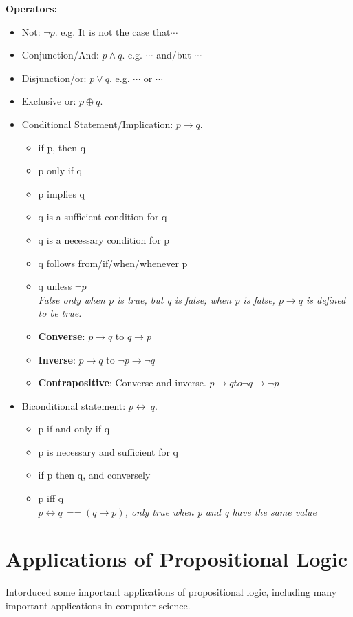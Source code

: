 \documentclass[none,green,normal,cn]{elegantnote}
\begin{document}
\textbf{Operators:}
\begin{itemize}
\item Not: $\neg p$. \qquad e.g. It is not the case that$\cdots$
\item Conjunction/And: $p \wedge q$. \qquad e.g. $\cdots$ and/but $\cdots$
\item Disjunction/or: $p \vee q$. \qquad e.g. $\cdots$ or $\cdots$
\item Exclusive or: $p \oplus q$.
\item Conditional Statement/Implication: $p \rightarrow q$.
      \begin{itemize}
        \item if p, then q
        \item p only if q
        \item p implies q
        \item q is a sufficient condition for q
        \item q is a necessary condition for p
        \item q follows from/if/when/whenever p
        \item q unless $\neg p$
        \\ \emph{False only when p is true, but q is false; when p is false, $p \rightarrow q$ is defined to be true.}
        \item \textbf{Converse}: $p \rightarrow q$ to $q \rightarrow p$
        \item \textbf{Inverse}: \(p \rightarrow q\) to \(\neg p \rightarrow \neg q\)
        \item \textbf{Contrapositive}: Converse and inverse. \(p \rightarrow q to \neg q \rightarrow \neg p\)
      \end{itemize}
\item Biconditional statement: \(p \leftrightarrow\ q\).
      \begin{itemize}
        \item p if and only if q
        \item p is necessary and sufficient for q
        \item if p then q, and conversely
        \item p iff q
        \\ \emph{\(p \leftrightarrow q \) == \((q \rightarrow p)\), only true when p and q have the same value}
      \end{itemize}
\end{itemize}

\section{Applications of Propositional Logic}
Intorduced some important applications of propositional logic, including many important applications in computer science.
\end{document}

